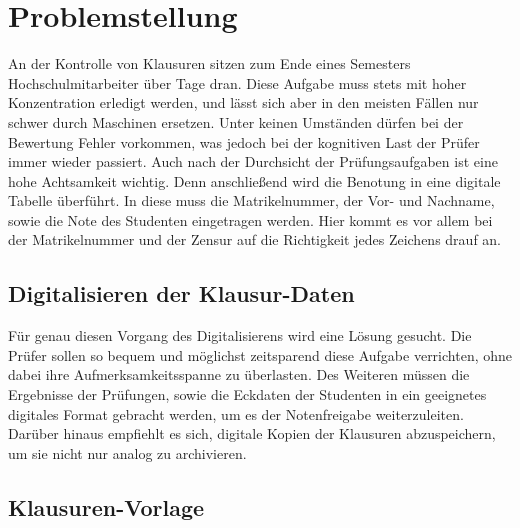 \documentclass[nomenclature, oneside, 150]{HSMW-Thesis}
\begin{document}

\chapter{Problemstellung} 
	An der Kontrolle von Klausuren sitzen zum Ende eines Semesters Hochschulmitarbeiter über Tage dran. Diese Aufgabe muss stets mit hoher Konzentration erledigt werden, und lässt sich aber in den meisten Fällen nur schwer durch Maschinen ersetzen. Unter keinen Umständen dürfen bei der Bewertung Fehler vorkommen, was jedoch bei der kognitiven Last der Prüfer immer wieder passiert. Auch nach der Durchsicht der Prüfungsaufgaben ist eine hohe Achtsamkeit wichtig. Denn anschließend wird die Benotung in eine digitale Tabelle überführt. In diese muss die Matrikelnummer, der Vor- und Nachname, sowie die Note des Studenten eingetragen werden. Hier kommt es vor allem bei der Matrikelnummer und der Zensur auf die Richtigkeit jedes Zeichens drauf an. 
	
	\section{Digitalisieren der Klausur-Daten}
	Für genau diesen Vorgang des Digitalisierens wird eine Lösung gesucht. Die Prüfer sollen so bequem und möglichst zeitsparend diese Aufgabe verrichten, ohne dabei ihre Aufmerksamkeitsspanne zu überlasten. Des Weiteren müssen die Ergebnisse der Prüfungen, sowie die Eckdaten der Studenten in ein geeignetes digitales Format gebracht werden, um es der Notenfreigabe weiterzuleiten. Darüber hinaus empfiehlt es sich, digitale Kopien der Klausuren abzuspeichern, um sie nicht nur analog zu archivieren.
	
	\section{Klausuren-Vorlage}
	
\end{document}
